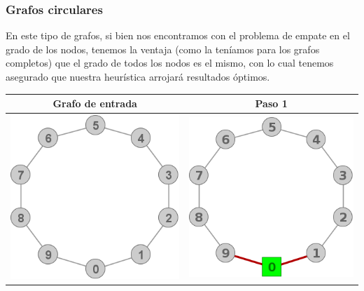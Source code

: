 \subsubsection{Grafos circulares}
\label{subsub:circulares}
	En este tipo de grafos, si bien nos encontramos con el problema de empate en el 
	grado de los nodos, tenemos la ventaja (como la ten\'iamos para los grafos completos)
	que el grado de todos los nodos es el mismo, con lo cual tenemos asegurado que 
	nuestra heur\'istica arrojar\'a resultados \'optimos.
	\begin{center}
		\begin{tabular}{ |c||c| }
			\hline
			Grafo de entrada & Paso 1 \\
			\hline\hline
			\includegraphics[scale = 0.4]{img/ej3/constructiva_golosa/Circle_st0.png} &
			\includegraphics[scale = 0.4]{img/ej3/constructiva_golosa/Circle_st1.png} \\
			\hline
		\end{tabular}
	\end{center}

